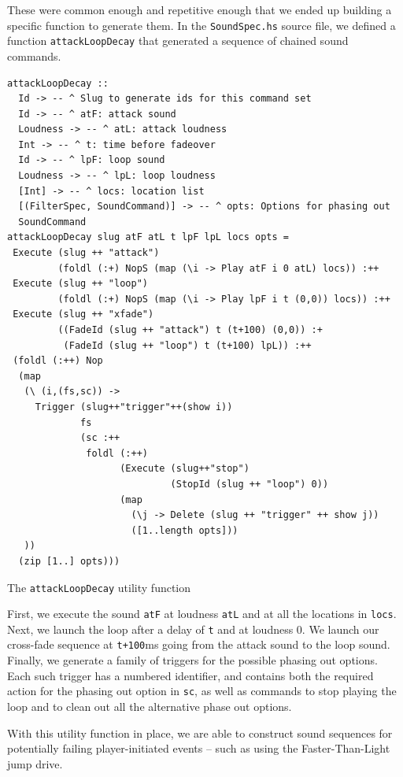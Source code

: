 These were common enough and repetitive enough that we ended up building a specific function to generate them. In the \texttt{SoundSpec.hs} source file, we defined a function \texttt{attackLoopDecay} that generated a sequence of chained sound commands.

\begin{listing}
\begin{verbatim}
attackLoopDecay :: 
  Id -> -- ^ Slug to generate ids for this command set
  Id -> -- ^ atF: attack sound
  Loudness -> -- ^ atL: attack loudness
  Int -> -- ^ t: time before fadeover
  Id -> -- ^ lpF: loop sound
  Loudness -> -- ^ lpL: loop loudness
  [Int] -> -- ^ locs: location list
  [(FilterSpec, SoundCommand)] -> -- ^ opts: Options for phasing out
  SoundCommand
attackLoopDecay slug atF atL t lpF lpL locs opts = 
 Execute (slug ++ "attack") 
         (foldl (:+) NopS (map (\i -> Play atF i 0 atL) locs)) :++
 Execute (slug ++ "loop") 
         (foldl (:+) NopS (map (\i -> Play lpF i t (0,0)) locs)) :++
 Execute (slug ++ "xfade") 
         ((FadeId (slug ++ "attack") t (t+100) (0,0)) :+
          (FadeId (slug ++ "loop") t (t+100) lpL)) :++
 (foldl (:++) Nop 
  (map 
   (\ (i,(fs,sc)) -> 
     Trigger (slug++"trigger"++(show i)) 
             fs 
             (sc :++ 
              foldl (:++) 
                    (Execute (slug++"stop") 
                             (StopId (slug ++ "loop") 0))
                    (map 
                      (\j -> Delete (slug ++ "trigger" ++ show j))
                      ([1..length opts]))
   ))
  (zip [1..] opts)))
\end{verbatim}
\caption{The \texttt{attackLoopDecay} utility function}
\end{listing}

First, we execute the sound \texttt{atF} at loudness \texttt{atL} and
at all the locations in \texttt{locs}. Next, we launch the loop after
a delay of \texttt{t} and at loudness 0. We launch our cross-fade
sequence at \texttt{t+100}ms going from the attack sound to the loop
sound. Finally, we generate a family of triggers for the possible
phasing out options. Each such trigger has a numbered identifier, and
contains both the required action for the phasing out option in
\texttt{sc}, as well as commands to stop playing the loop and to clean
out all the alternative phase out options.

With this utility function in place, we are able to construct sound
sequences for potentially failing player-initiated events -- such as
using the Faster-Than-Light jump drive.

